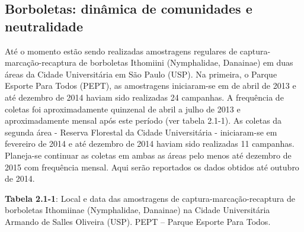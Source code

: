 \subsection{Borboletas: dinâmica de comunidades e neutralidade} %
\label{sec:dinamica-temporal-borb} 
Até o momento estão sendo realizadas amostragens regulares de captura-marcação-recaptura de borboletas Ithomiini (Nymphalidae, Danainae) em duas áreas da Cidade Universitária em São Paulo (USP). Na primeira, o Parque Esporte Para Todos (PEPT), as amostragens iniciaram-se em de abril de 2013 e até dezembro de 2014 haviam sido realizadas 24 campanhas. A frequência de coletas foi aproximadamente quinzenal de abril a julho de 2013 e aproximadamente mensal após este período (ver tabela 2.1-1). As coletas da segunda área - Reserva Florestal da Cidade Universitária - iniciaram-se em fevereiro de 2014 e até dezembro de 2014 haviam sido realizadas 11 campanhas. Planeja-se continuar as coletas em ambas as áreas pelo menos até dezembro de 2015 com frequência mensal. Aqui serão reportados os dados obtidos até outubro de 2014.

\textbf{Tabela 2.1-1}: Local e data das amostragens de captura-marcação-recaptura de borboletas Ithomiinae (Nymphalidae, Danainae) na Cidade Universitária Armando de Salles Oliveira (USP). PEPT – Parque Esporte Para Todos.

